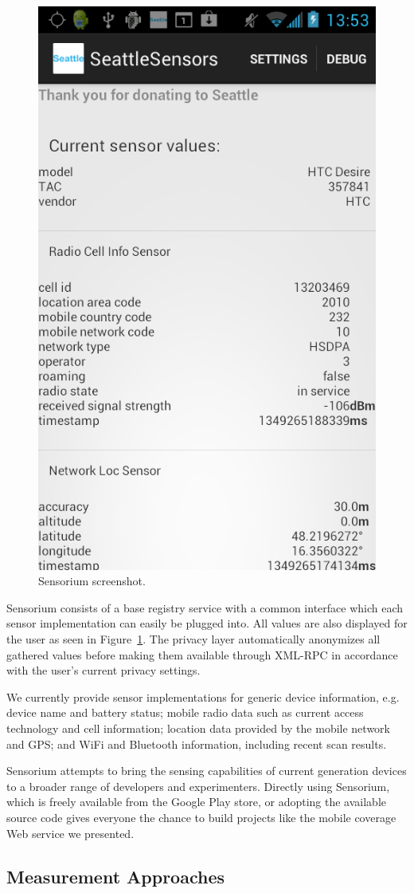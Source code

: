 \begin{figure}[t!]
\centering
\includegraphics[width=0.45\columnwidth]{images/sesescreenshot.png}
\caption{\small Sensorium screenshot.}
\label{c5:fig:screenshot}
\end{figure}

Sensorium consists of a base registry service with a common interface which each sensor implementation can easily be plugged into. All values are also displayed for the user as seen in Figure~\ref{c5:fig:screenshot}. The privacy layer automatically anonymizes all gathered values before making them available through XML-RPC in accordance with the user's current privacy settings.

We currently provide sensor implementations for generic device information, e.g. device name and battery status; mobile radio data such as current access technology and cell information; location data provided by the mobile network and GPS; and  WiFi and Bluetooth information, including recent scan results.

Sensorium attempts to bring the sensing capabilities of current generation devices to a broader range of developers and experimenters. Directly using Sensorium, which is freely available from the Google Play store, or adopting the available source code gives everyone the chance to build projects like the mobile coverage Web service we presented.


\subsection{Measurement Approaches}
\label{c5:mobilestreamingtestbed}

